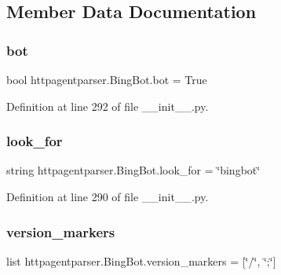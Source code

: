\subsection{Member Data Documentation}
\hypertarget{classhttpagentparser_1_1_bing_bot_a7b177ba9fceb92b6f24f1f89031439fb}{}\label{classhttpagentparser_1_1_bing_bot_a7b177ba9fceb92b6f24f1f89031439fb} 
\subsubsection{\texorpdfstring{bot}{bot}}
{\footnotesize\ttfamily bool httpagentparser.\+Bing\+Bot.\+bot = True\hspace{0.3cm}{\ttfamily [static]}}



Definition at line 292 of file \+\_\+\+\_\+init\+\_\+\+\_\+.\+py.

\hypertarget{classhttpagentparser_1_1_bing_bot_ae90f6e9b017e905b4301e222ed4fd390}{}\label{classhttpagentparser_1_1_bing_bot_ae90f6e9b017e905b4301e222ed4fd390} 
\subsubsection{\texorpdfstring{look\+\_\+for}{look\_for}}
{\footnotesize\ttfamily string httpagentparser.\+Bing\+Bot.\+look\+\_\+for = \char`\"{}bingbot\char`\"{}\hspace{0.3cm}{\ttfamily [static]}}



Definition at line 290 of file \+\_\+\+\_\+init\+\_\+\+\_\+.\+py.

\hypertarget{classhttpagentparser_1_1_bing_bot_a29f93d36e3786ff440fc9140f2965d96}{}\label{classhttpagentparser_1_1_bing_bot_a29f93d36e3786ff440fc9140f2965d96} 
\subsubsection{\texorpdfstring{version\+\_\+markers}{version\_markers}}
{\footnotesize\ttfamily list httpagentparser.\+Bing\+Bot.\+version\+\_\+markers = \mbox{[}\char`\"{}/\char`\"{}, \char`\"{};\char`\"{}\mbox{]}\hspace{0.3cm}{\ttfamily [static]}}



